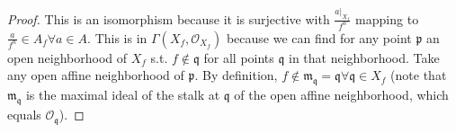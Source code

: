 \begin{exercise}
\begin{enumerate}[(a)]
\begin{proof}
		This is an isomorphism because it is surjective with $\frac{a|_{X_f}}{f^n} $ mapping to $\frac{a}{f^n} \in A_f \forall a\in A$.
		This is in $\Gamma(X_f,\mathscr{O}_{X_f}) $ because we can find for any point $\mathfrak{p} $ an open neighborhood of $X_f $ s.t. $f\notin \mathfrak{q}$ for all points $\mathfrak{q} $ in that neighborhood.
		Take any open affine neighborhood of $\mathfrak{p} $.
		By definition, $f\notin \mathfrak{m}_{\mathfrak{q}} = \mathfrak{q} \forall \mathfrak{q}\in X_f$ (note that $\mathfrak{m}_{\mathfrak{q}} $ is the maximal ideal of the stalk at $\mathfrak{q} $ of the open affine neighborhood, which equals $\mathscr{O}_ \mathfrak{q} $).
	\end{proof}
\end{enumerate}
\end{exercise}

